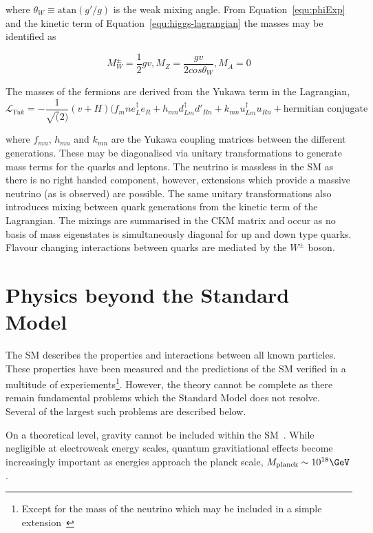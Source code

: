 where $\theta_W \equiv \text{atan}(g'/g)$ is the weak mixing angle. From Equation~\ref{equ:phiExp} and
the kinetic term of Equation~\ref{equ:higgs-lagrangian} the masses may be identified as

\begin{equation}
M_W^\pm = \frac{1}{2}gv, M_Z = \frac{gv}{2cos\theta_W}, M_A = 0
\end{equation}

The masses of the fermions are derived from the Yukawa term in the Lagrangian, 
\begin{equation}
\mathcal{L}_{Yuk} = - \frac{1}{\sqrt(2)}(v + H)(f_mn e_L^{\dagger}e_R + h_{mn} d_{Lm}^{\dagger}d'_{Rn} + k_{mn} u_{Lm}^{\dagger}u_{Rn} + \text{hermitian conjugate}
\end{equation}

where $f_{mn}$, $h_{mn}$ and $k_{mn}$ are the Yukawa coupling matrices between the different generations. These may be diagonalised via unitary transformations
to generate mass terms for the quarks and leptons. The neutrino is massless in the SM as there is no right handed component, 
however, extensions which provide a massive neutrino (as is observed) are possible. The same unitary transformations
also introduces mixing between quark generations from the kinetic term of the Lagrangian. The mixings are summarised in the 
CKM matrix and occur as no basis of mass eigenstates is simultaneously diagonal for up and down type quarks. Flavour changing
interactions between quarks are mediated by the $W^{\pm}$ boson.

\section{Physics beyond the Standard Model}

The SM describes the properties and interactions between all known particles. These properties 
have been measured and the predictions of the SM verified in a multitude
of experiements\footnote{Except for the mass of the neutrino which may be
included in a simple extension~\cite{}}. However, the theory cannot be complete 
as there remain fundamental problems which the Standard Model does not resolve.
Several of the largest such problems are described below.

On a theoretical level, gravity cannot be included within 
the SM~\cite{}. While negligible at electroweak energy
scales, quantum gravitiational effects become increasingly important as
energies approach the planck scale, $M_{\text{planck}} \sim 10^{18} \GeV$. 

